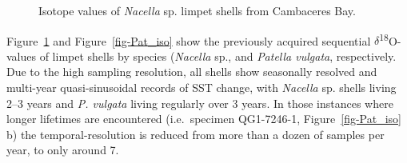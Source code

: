 \documentclass[
  authoryear,
  preprint,
  3p]{elsarticle}
\begin{document}
\begin{figure}


\caption{\label{fig-Nac_iso}Isotope values of \emph{Nacella} sp. limpet
shells from Cambaceres Bay.}

\end{figure}%

Figure~\ref{fig-Nac_iso} and Figure~\ref{fig-Pat_iso} show the
previously acquired sequential \(\delta\)\textsuperscript{18}O-values of
limpet shells by species (\emph{Nacella} sp., and \emph{Patella
vulgata}, respectively. Due to the high sampling resolution, all shells
show seasonally resolved and multi-year quasi-sinusoidal records of SST
change, with \emph{Nacella} sp. shells living 2--3 years and \emph{P.
vulgata} living regularly over 3 years. In those instances where longer
lifetimes are encountered (i.e.~specimen QG1-7246-1,
Figure~\ref{fig-Pat_iso} b) the temporal-resolution is reduced from more
than a dozen of samples per year, to only around 7.
\end{document}

